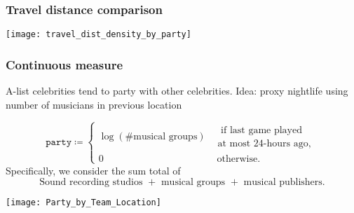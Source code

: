 \documentclass{beamer}
\begin{document}
\begin{frame}   
  \frametitle{Travel distance comparison}
  \centering \texttt{[image: travel\_dist\_density\_by\_party]} 
\end{frame}


\begin{frame}   \frametitle{Continuous measure}
  \begin{block}{A-list celebrities tend to party with other celebrities.}     Idea: proxy nightlife using number of musicians in previous location

    \[
      \texttt{party} \coloneqq \begin{cases}       \log \left(\# \textrm{musical groups}\right) &\substack{\textrm{ if last game played} \\ \textrm{at most 24-hours ago,}} \\
      0 &\textrm{ otherwise.}
    \end{cases}
    \]
    \newline
    Specifically, we consider the sum total of
    \[
      \textrm{Sound recording studios } + \textrm{ musical groups } + \textrm{ musical publishers}.
    \]   \end{block} \end{frame}

\begin{frame}   
  \hspace*{-25pt}
  \texttt{[image: Party\_by\_Team\_Location]} 
\end{frame}
\end{document}
